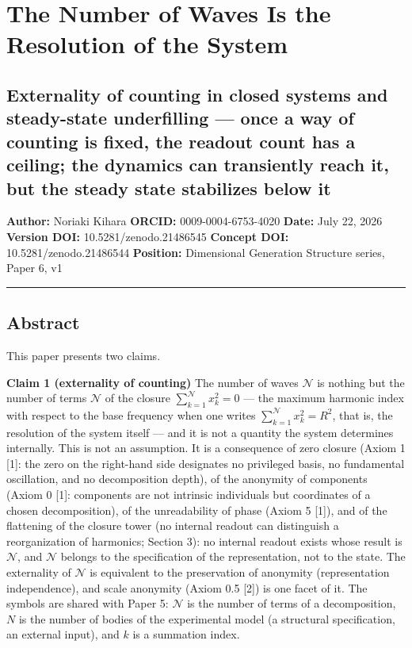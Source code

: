 \documentclass[
  a4paper,
]{article}
\author{}
\date{}
\begin{document}
\section{The Number of Waves Is the Resolution of the
System}\label{the-number-of-waves-is-the-resolution-of-the-system}

\subsection{Externality of counting in closed systems and steady-state
underfilling --- once a way of counting is fixed, the readout count has
a ceiling; the dynamics can transiently reach it, but the steady state
stabilizes below
it}\label{externality-of-counting-in-closed-systems-and-steady-state-underfilling-once-a-way-of-counting-is-fixed-the-readout-count-has-a-ceiling-the-dynamics-can-transiently-reach-it-but-the-steady-state-stabilizes-below-it}

\textbf{Author:} Noriaki Kihara \textbf{ORCID:} 0009-0004-6753-4020
\textbf{Date:} July 22, 2026 \textbf{Version DOI:}
10.5281/zenodo.21486545 \textbf{Concept DOI:} 10.5281/zenodo.21486544
\textbf{Position:} Dimensional Generation Structure series, Paper 6, v1

\begin{center}\rule{0.5\linewidth}{0.5pt}\end{center}

\subsection{Abstract}\label{abstract}

This paper presents two claims.

\textbf{Claim 1 (externality of counting)} The number of waves
\(\mathcal N\) is nothing but the number of terms \(\mathcal N\) of the
closure \(\sum_{k=1}^{\mathcal N} x_k^2=0\) --- the maximum harmonic
index with respect to the base frequency when one writes
\(\sum_{k=1}^{\mathcal N} x_k^2=R^2\), that is, the resolution of the
system itself --- and it is not a quantity the system determines
internally. This is not an assumption. It is a consequence of zero
closure (Axiom 1 {[}1{]}: the zero on the right-hand side designates no
privileged basis, no fundamental oscillation, and no decomposition
depth), of the anonymity of components (Axiom 0 {[}1{]}: components are
not intrinsic individuals but coordinates of a chosen decomposition), of
the unreadability of phase (Axiom 5 {[}1{]}), and of the flattening of
the closure tower (no internal readout can distinguish a reorganization
of harmonics; Section 3): no internal readout exists whose result is
\(\mathcal N\), and \(\mathcal N\) belongs to the specification of the
representation, not to the state. The externality of \(\mathcal N\) is
equivalent to the preservation of anonymity (representation
independence), and scale anonymity (Axiom 0.5 {[}2{]}) is one facet of
it. The symbols are shared with Paper 5: \(\mathcal N\) is the number of
terms of a decomposition, \(N\) is the number of bodies of the
experimental model (a structural specification, an external input), and
\(k\) is a summation index.
\end{document}
